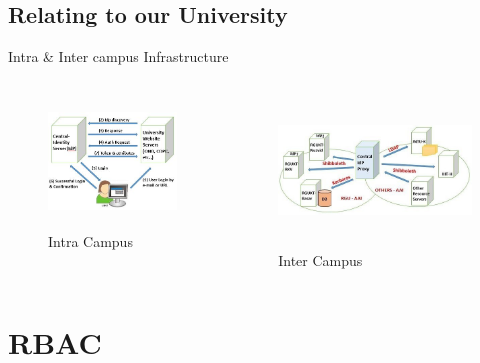 \documentclass[10pt,xcolor=dvipsnames]{beamer}
\begin{document}
\subsection{Relating to our University}
\begin{frame}{Intra \& Inter campus Infrastructure}
\begin{columns}
\begin{figure}[H]
\includegraphics[width=4cm,height=3.5cm]{U1}
\caption{Intra Campus\label{fig:Intra Campus}}
\end{figure}
\begin{figure}[H]
\includegraphics[width=6cm,height=4cm]{ex1}
\caption{Inter Campus\label{fig:Inter Campus}}
\end{figure}
\end{columns}

\end{frame}

\section{RBAC}
\end{document}
